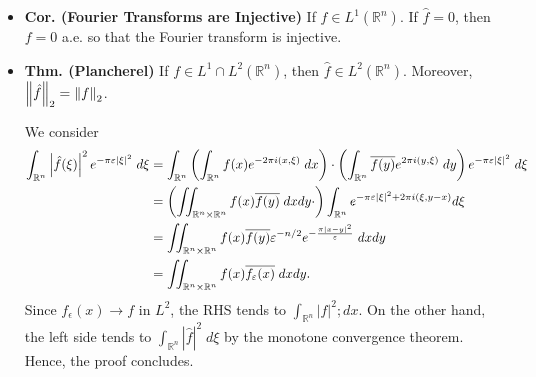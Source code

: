 \documentclass{article}
\begin{document}
\begin{itemize}
{\begin{quote}
			(\textbf{Step 2}) Now we pass to the limit $\epsilon \to 0$. In this limit, we know that $f_{\epsilon} \to f$ in $L^{1}$. On the other hand, we also know that by dominated convergence, 
				\begin{equation}
					 \int_{\mathbb{R}^{n}}\hat{f}(\xi)e^{-\pi \epsilon |\xi|^{2}}e^{2\pi i (\xi, x)}\;d\xi \to \int_{\mathbb{R}^{n}}\hat{f}(\xi)e^{2\pi i (\xi,x)}\;d\xi, 
				\end{equation}
			so that 
				\begin{equation}
					f(x) = \int_{\mathbb{R}^{n}}\hat{f}(\xi)e^{2\pi i (\xi,x)}\;d\xi \quad \text{ a.e. $x \in \mathbb{R}^{n}$}. 
				\end{equation}
		\end{quote}
	Thus, the proof concludes. Essentially, the main idea was to convolve $f$ with a smoothing function, and then use dominated convergence to force the limits to work. 
	}
	
	\item \textbf{Cor. (Fourier Transforms are Injective)} If $f \in L^{1}(\mathbb{R}^{n})$. If $\hat{f} = 0$, then $f = 0$ a.e. so that the Fourier transform is injective. 
	
	\newpage 
	\item \textbf{Thm. (Plancherel)} If $f \in L^{1} \cap L^{2}(\mathbb{R}^{n})$, then $\hat{f} \in L^{2}(\mathbb{R}^{n})$. Moreover, $\left\Vert \hat{f} \right\Vert_{2} = \left\Vert f \right\Vert_{2}$. 
	
	{\color{blue}
		We consider 
			\begin{align}
				\begin{split}
					\int_{\mathbb{R}^{n}}\left| \hat{f}(\xi) \right|^{2}e^{-\pi \varepsilon |\xi|^{2}}\;d\xi &= \int_{\mathbb{R}^{n}}\left(\int_{\mathbb{R}^{n}}f(x)e^{-2\pi i (x, \xi)}\;dx\right) \cdot \left(\int_{\mathbb{R}^{n}}\overline{f(y)}e^{2\pi i (y, \xi)}\;dy\right)e^{-\pi \varepsilon |\xi|^{2}}\;d\xi \\
					&= \left(\iint_{\mathbb{R}^{n}\times \mathbb{R}^{n}}f(x)\overline{f(y)}\;dx dy \cdot \right)\int_{\mathbb{R}^{n}}e^{-\pi \varepsilon |\xi|^{2} + 2\pi i (\xi, y - x)}d\xi \\
					&= \iint_{\mathbb{R}^{n} \times \mathbb{R}^{n}}f(x)\overline{f(y)}\varepsilon^{-n/2}e^{-\frac{\pi|x - y|^{2}}{\varepsilon}}\;dx dy \\
					&= \iint_{\mathbb{R}^{n} \times \mathbb{R}^{n}}f(x)\overline{f_{\varepsilon}(x)}\;dx dy. 
				\end{split}
			\end{align}
		Since $f_{\epsilon}(x) \to f$ in $L^{2}$, the RHS tends to $\int_{\mathbb{R}^{n}}|f|^{2};dx$. On the other hand, the left side tends to $\int_{\mathbb{R}^{n}}|\hat{f}|^{2}\;d\xi$ by the monotone convergence theorem. Hence, the proof concludes. 
	
	}
\end{itemize}
\end{document}
